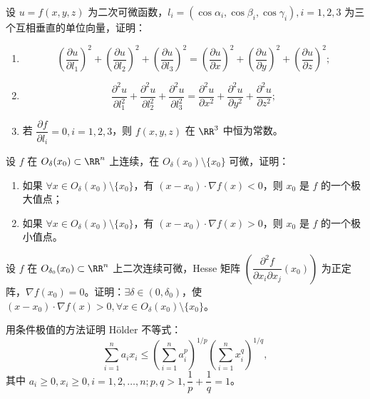 \begin{xreferenceproblem}[4]
设 $u=f(x,y,z)$ 为二次可微函数，$l_i=(\cos\alpha_i,\cos\beta_i,\cos\gamma_i),i=1,2,3$ 为三个互相垂直的单位向量，证明：
  \begin{enumerate}[label=(\arabic*)]
    \item
    \[
      \left(\frac{\partial u}{\partial l_1}\right)^2
      +\left(\frac{\partial u}{\partial l_2}\right)^2
      +\left(\frac{\partial u}{\partial l_3}\right)^2
      =\left(\frac{\partial u}{\partial x}\right)^2
      +\left(\frac{\partial u}{\partial y}\right)^2
      +\left(\frac{\partial u}{\partial z}\right)^2;
    \]
    \item
    \[
      \frac{\partial^2u}{\partial l_1^2}
      +\frac{\partial^2u}{\partial l_2^2}
      +\frac{\partial^2u}{\partial l_3^2}
      =\frac{\partial^2u}{\partial x^2}
      +\frac{\partial^2u}{\partial y^2}
      +\frac{\partial^2u}{\partial z^2};
    \]
    \item 若 $\dfrac{\partial f}{\partial l_i}=0,i=1,2,3$，则 $f(x,y,z)$ 在 $\RR^3$ 中恒为常数。
  \end{enumerate}
\end{xreferenceproblem}

\begin{xreferenceproblem}[5]
设 $f$ 在 $O_\delta(x_0)\subset\RR^n$ 上连续，在 $O_\delta(x_0)\setminus\{x_0\}$ 可微，证明：
  \begin{enumerate}[label=(\arabic*)]
    \item 如果 $\forall x\in O_\delta(x_0)\setminus\{x_0\}$，有 $(x-x_0)\cdot\nabla f(x)<0$，则 $x_0$ 是 $f$ 的一个极大值点；
    \item 如果 $\forall x\in O_\delta(x_0)\setminus\{x_0\}$，有 $(x-x_0)\cdot\nabla f(x)>0$，则 $x_0$ 是 $f$ 的一个极小值点。
  \end{enumerate}
\end{xreferenceproblem}

\begin{xreferenceproblem}[6]
设 $f$ 在 $O_{\delta_0}(x_0)\subset\RR^n$ 上二次连续可微，Hesse 矩阵 $\left(\dfrac{\partial^2f}{\partial x_i\partial x_j}(x_0)\right)$ 为正定阵，$\nabla f(x_0)=0$。证明：$\exists\delta\in(0,\delta_0)$，使 $(x-x_0)\cdot\nabla f(x)>0,\forall x\in O_\delta(x_0)\setminus\{x_0\}$。
\end{xreferenceproblem}

\begin{xreferenceproblem}[7]
用条件极值的方法证明 Hölder 不等式：
  \[
    \sum_{i=1}^n a_ix_i
    \le\left(\sum_{i=1}^n a_i^p\right)^{1/p}
    \left(\sum_{i=1}^n x_i^q\right)^{1/q},
  \]
  其中 $a_i\ge0,x_i\ge0,i=1,2,\ldots,n;p,q>1,\dfrac1p+\dfrac1q=1$。
\end{xreferenceproblem}

